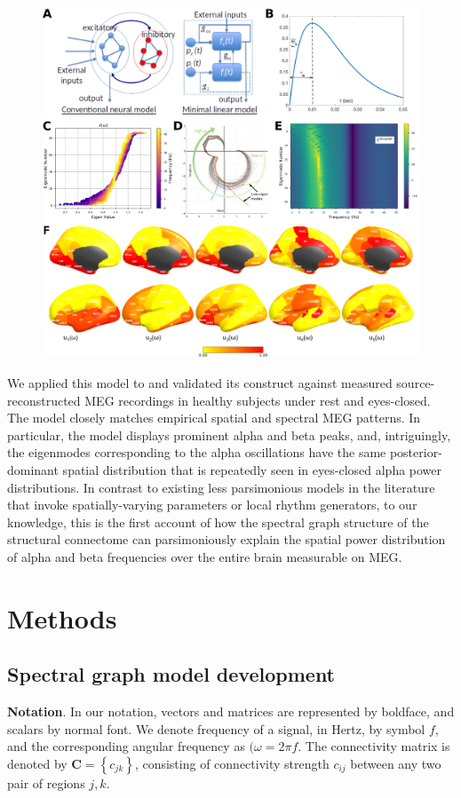 \begin{figure}[h!]
	\ContinuedFloat
    \centering
    \captionsetup{labelformat=adja-page}
    \includegraphics[width=\textwidth]{../figures/chapter5/figure1.png}
    \caption{}
\end{figure}

We applied this model to and validated its construct against measured
source-reconstructed MEG recordings in healthy subjects under rest and
eyes-closed. The model closely matches empirical spatial and spectral
MEG patterns. In particular, the model displays prominent alpha and beta
peaks, and, intriguingly, the eigenmodes corresponding to the alpha
oscillations have the same posterior-dominant spatial distribution that
is repeatedly seen in eyes-closed alpha power distributions. In contrast
to existing less parsimonious models in the literature that invoke
spatially-varying parameters or local rhythm generators, to our
knowledge, this is the first account of how the spectral graph structure
of the structural connectome can parsimoniously explain the spatial
power distribution of alpha and beta frequencies over the entire brain
measurable on MEG.

\section{Methods}

\subsection{Spectral graph model development}
\textbf{Notation}. In our notation, vectors and matrices are
represented by boldface, and scalars by normal font. We denote frequency
of a signal, in Hertz, by symbol $f$, and the corresponding angular
frequency as $(\omega = 2 \pi f$. The connectivity matrix is denoted by
$\mathbf{C} = \left\{ c_{jk} \right\}$, consisting of
connectivity strength $c_{ij}$ between any two pair of regions $j,k$.

